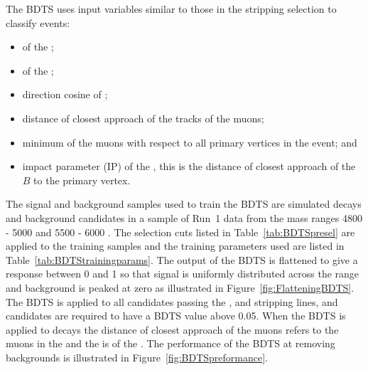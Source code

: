 The BDTS uses input variables similar to those in the stripping selection to classify events:
\begin{itemize}
\item \chiIP of the \bsd;
\item \chivtx of the \bsd;
\item direction cosine of \bsd;
\item distance of closest approach of the tracks of the muons;
\item minimum \chiIP of the muons with respect to all primary vertices in the event; and 
\item impact parameter (IP) of the \bsd, this is the distance of closest approach of the $B$ to the primary vertex.
\end{itemize}
The signal and background samples used to train the BDTS are simulated \bsmumu decays and background candidates in a sample of Run~1 data from the mass ranges 4800 - 5000 \mevcc and 5500 - 6000 \mevcc. The selection cuts listed in Table~\ref{tab:BDTSpresel} are applied to the training samples and the training parameters used are listed in Table~\ref{tab:BDTStrainingparams}. The output of the BDTS is flattened to give a response between 0 and 1 so that signal is uniformly distributed across the range and background is peaked at zero as illustrated in Figure~\ref{fig:FlatteningBDTS}. The BDTS is applied to all candidates passing the \bmumu, \bhh and \bujpsik stripping lines, and candidates are required to have a BDTS value above 0.05. When the BDTS is applied to \bujpsik decays the distance of closest approach of the muons refers to the muons in the \jpsi and the \chivtx is of the \jpsi. %
The performance of the BDTS at removing backgrounds is illustrated in Figure~\ref{fig:BDTSpreformance}. %


